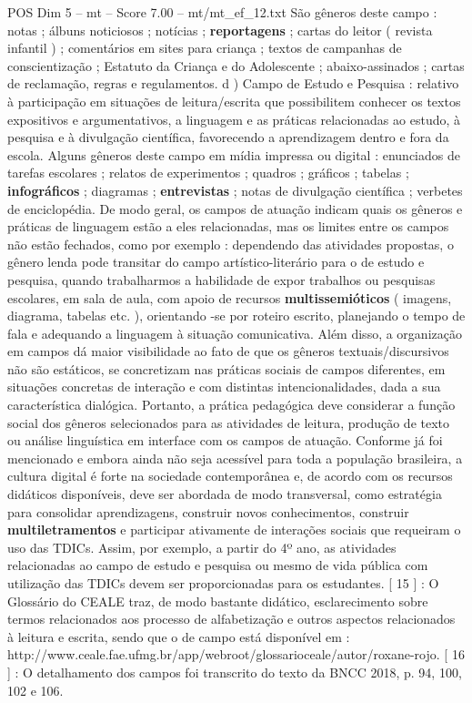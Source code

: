 \begin{textsample}{POS Dim 5 – mt – Score 7.00 – mt/mt\_ef\_12.txt}
São gêneros deste campo : notas ; álbuns noticiosos ; notícias ; \textbf{reportagens} ; cartas do leitor ( revista infantil ) ; comentários em sites para criança ; textos de campanhas de conscientização ; Estatuto da Criança e do Adolescente ; abaixo-assinados ; cartas de reclamação, regras e regulamentos. d ) Campo de Estudo e Pesquisa : relativo à participação em situações de leitura/escrita que possibilitem conhecer os textos expositivos e argumentativos, a linguagem e as práticas relacionadas ao estudo, à pesquisa e à divulgação científica, favorecendo a aprendizagem dentro e fora da escola.
Alguns gêneros deste campo em mídia impressa ou digital : enunciados de tarefas escolares ; relatos de experimentos ; quadros ; gráficos ; tabelas ; \textbf{infográficos} ; diagramas ; \textbf{entrevistas} ; notas de divulgação científica ; verbetes de enciclopédia.
De modo geral, os campos de atuação indicam quais os gêneros e práticas de linguagem estão a eles relacionadas, mas os limites entre os campos não estão fechados, como por exemplo : dependendo das atividades propostas, o gênero lenda pode transitar do campo artístico-literário para o de estudo e pesquisa, quando trabalharmos a habilidade de expor trabalhos ou pesquisas escolares, em sala de aula, com apoio de recursos \textbf{multissemióticos} ( imagens, diagrama, tabelas etc. ), orientando -se por roteiro escrito, planejando o tempo de fala e adequando a linguagem à situação comunicativa.
Além disso, a organização em campos dá maior visibilidade ao fato de que os gêneros textuais/discursivos não são estáticos, se concretizam nas práticas sociais de campos diferentes, em situações concretas de interação e com distintas intencionalidades, dada a sua característica dialógica.
Portanto, a prática pedagógica deve considerar a função social dos gêneros selecionados para as atividades de leitura, produção de texto ou análise linguística em interface com os campos de atuação.
Conforme já foi mencionado e embora ainda não seja acessível para toda a população brasileira, a cultura digital é forte na sociedade contemporânea e, de acordo com os recursos didáticos disponíveis, deve ser abordada de modo transversal, como estratégia para consolidar aprendizagens, construir novos conhecimentos, construir \textbf{multiletramentos} e participar ativamente de interações sociais que requeiram o uso das TDICs.
Assim, por exemplo, a partir do 4º ano, as atividades relacionadas ao campo de estudo e pesquisa ou mesmo de vida pública com utilização das TDICs devem ser proporcionadas para os estudantes. [ 15 ] : O Glossário do CEALE traz, de modo bastante didático, esclarecimento sobre termos relacionados aos processo de alfabetização e outros aspectos relacionados à leitura e escrita, sendo que o de campo está disponível em : http://www.ceale.fae.ufmg.br/app/webroot/glossarioceale/autor/roxane-rojo. [ 16 ] : O detalhamento dos campos foi transcrito do texto da BNCC 2018, p. 94, 100, 102 e 106.

\end{textsample}
